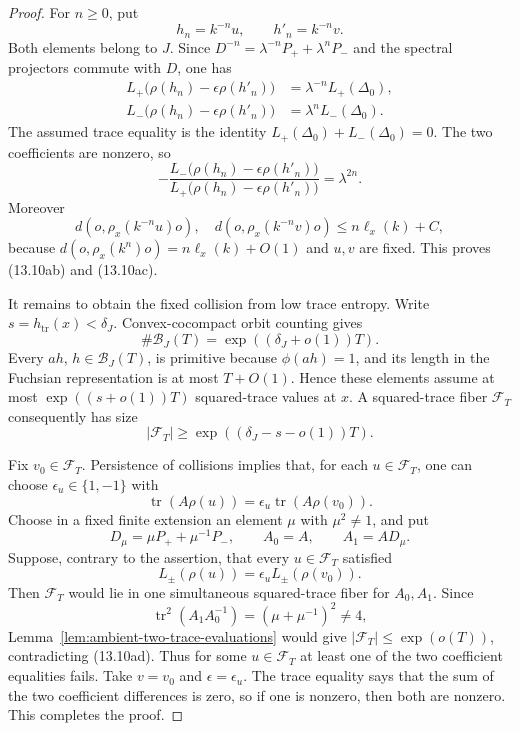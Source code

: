 \documentclass[11pt,reqno]{amsart}
\theoremstyle{definition}
\theoremstyle{remark}
\newcommand{\Tr}{\operatorname{tr}}
\begin{document}
\begin{proof}
For \(n\ge0\), put
\[
 h_n=k^{-n}u,\qquad h'_n=k^{-n}v.
\]
Both elements belong to \(J\).  Since
\(D^{-n}=\lambda^{-n}P_++\lambda^nP_-\) and the spectral projectors
commute with \(D\), one has
\[
 \begin{split}
 L_+\bigl(\rho(h_n)-\epsilon\rho(h'_n)\bigr)
   &=\lambda^{-n}L_+(\Delta_0),\\
 L_-\bigl(\rho(h_n)-\epsilon\rho(h'_n)\bigr)
   &=\lambda^nL_-(\Delta_0).
 \end{split}
\]
The assumed trace equality is the identity
\(L_+(\Delta_0)+L_-(\Delta_0)=0\).  The two coefficients are nonzero, so
\[
 -\frac{L_-\bigl(\rho(h_n)-\epsilon\rho(h'_n)\bigr)}
        {L_+\bigl(\rho(h_n)-\epsilon\rho(h'_n)\bigr)}
 =\lambda^{2n}.
\]
Moreover
\[
 d(o,\rho_x(k^{-n}u)o),\quad
 d(o,\rho_x(k^{-n}v)o)
 \le n\ell_x(k)+C,
\]
because \(d(o,\rho_x(k^n)o)=n\ell_x(k)+O(1)\) and \(u,v\) are fixed.
This proves (13.10ab) and (13.10ac).

It remains to obtain the fixed collision from low trace entropy.  Write
\(s=h_{\Tr}(x)<\delta_J\).  Convex-cocompact orbit counting gives
\[
 \#\mathcal B_J(T)=\exp((\delta_J+o(1))T).
\]
Every \(ah\), \(h\in\mathcal B_J(T)\), is primitive because
\(\phi(ah)=1\), and its length in the Fuchsian representation is at most
\(T+O(1)\).  Hence
these elements assume at most \(\exp((s+o(1))T)\) squared-trace values at
\(x\).  A squared-trace fiber \(\mathcal F_T\) consequently has size
\[
 |\mathcal F_T|
 \ge \exp((\delta_J-s-o(1))T).
\tag{13.10ad}
\]

Fix \(v_0\in\mathcal F_T\).  Persistence of collisions implies that, for
each \(u\in\mathcal F_T\), one can choose
\(\epsilon_u\in\{1,-1\}\) with
\[
 \Tr(A\rho(u))=\epsilon_u\Tr(A\rho(v_0)).
\]
Choose in a fixed finite extension an element \(\mu\) with
\(\mu^2\ne1\), and put
\[
 D_\mu=\mu P_++\mu^{-1}P_-,\qquad A_0=A,\qquad A_1=AD_\mu.
\]
Suppose, contrary to the assertion, that every \(u\in\mathcal F_T\)
satisfied
\[
 L_\pm(\rho(u))=\epsilon_uL_\pm(\rho(v_0)).
\]
Then \(\mathcal F_T\) would lie in one simultaneous squared-trace fiber
for \(A_0,A_1\).  Since
\[
 \Tr^2(A_1A_0^{-1})=(\mu+\mu^{-1})^2\ne4,
\]
Lemma~\ref{lem:ambient-two-trace-evaluations} would give
\(|\mathcal F_T|\le\exp(o(T))\), contradicting (13.10ad).  Thus for some
\(u\in\mathcal F_T\) at least one of the two coefficient equalities fails.
Take \(v=v_0\) and \(\epsilon=\epsilon_u\).  The trace equality says that
the sum of the two coefficient differences is zero, so if one is nonzero,
then both are nonzero.  This completes the proof.
\end{proof}
\end{document}
